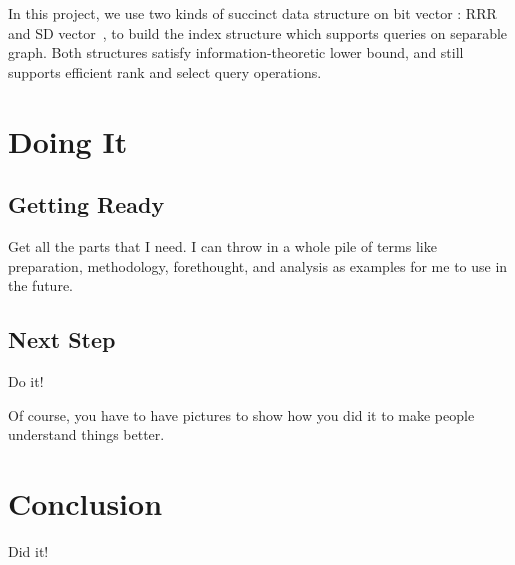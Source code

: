 \documentclass[12pt,glossary]{dalthesis}
\begin{document}
In this project, we use two kinds of succinct data structure on bit vector : RRR~\cite{RRR} and SD vector~\cite{SD-vector}, to build the index structure which supports queries on separable graph. Both structures satisfy information-theoretic lower bound, and still supports efficient rank and select query operations.

\chapter{Doing It}

\section{Getting Ready}

Get all the parts that I need.  I can throw in a whole pile of terms like
preparation,
methodology,
forethought,
and
analysis
as examples for me to use in the future.

\section{Next Step}

Do it!

Of course, you have to have pictures to show how you did it to make people
understand things better.

\chapter{Conclusion}

Did it!



\end{document}
